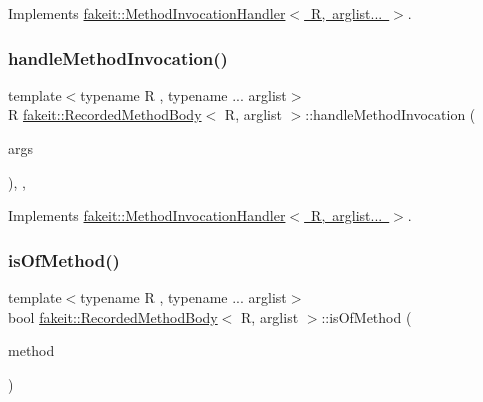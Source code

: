 Implements \mbox{\hyperlink{structfakeit_1_1MethodInvocationHandler_a6ef3fe1e948c1886a085bd948d61f730}{fakeit\+::\+Method\+Invocation\+Handler$<$ R, arglist... $>$}}.

\mbox{\label{classfakeit_1_1RecordedMethodBody_a7ba17fdfe96f573c1d3992433a50d170}} 
\subsubsection{\texorpdfstring{handleMethodInvocation()}{handleMethodInvocation()}\hspace{0.1cm}{\footnotesize\ttfamily [9/9]}}
{\footnotesize\ttfamily template$<$typename R , typename ... arglist$>$ \\
R \mbox{\hyperlink{classfakeit_1_1RecordedMethodBody}{fakeit\+::\+Recorded\+Method\+Body}}$<$ R, arglist $>$\+::handle\+Method\+Invocation (\begin{DoxyParamCaption}\item[{const typename \mbox{\hyperlink{structfakeit_1_1production__arg}{fakeit\+::production\+\_\+arg}}$<$ arglist $>$\+::type...}]{args }\end{DoxyParamCaption})\hspace{0.3cm}{\ttfamily [inline]}, {\ttfamily [override]}, {\ttfamily [virtual]}}



Implements \mbox{\hyperlink{structfakeit_1_1MethodInvocationHandler_a6ef3fe1e948c1886a085bd948d61f730}{fakeit\+::\+Method\+Invocation\+Handler$<$ R, arglist... $>$}}.

\mbox{\label{classfakeit_1_1RecordedMethodBody_ac83a9eb22dedef9e10f3494198b5e3e1}} 
\subsubsection{\texorpdfstring{isOfMethod()}{isOfMethod()}\hspace{0.1cm}{\footnotesize\ttfamily [1/9]}}
{\footnotesize\ttfamily template$<$typename R , typename ... arglist$>$ \\
bool \mbox{\hyperlink{classfakeit_1_1RecordedMethodBody}{fakeit\+::\+Recorded\+Method\+Body}}$<$ R, arglist $>$\+::is\+Of\+Method (\begin{DoxyParamCaption}\item[{\mbox{\hyperlink{structfakeit_1_1MethodInfo}{Method\+Info}} \&}]{method }\end{DoxyParamCaption})\hspace{0.3cm}{\ttfamily [inline]}}

